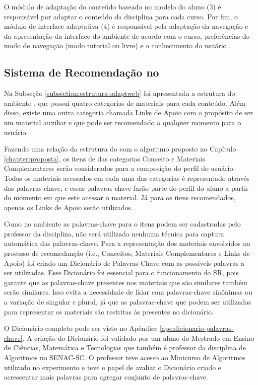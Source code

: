 O módulo de adaptação do conteúdo baseado no modelo do aluno (3) é responsável por adaptar o conteúdo da disciplina
para cada curso. Por fim, o módulo de interface adaptativa (4) é responsável pela adaptação da navegação e da
apresentação da interface do ambiente de acordo com o curso, preferências do modo de navegação (modo tutorial ou livre)
e o conhecimento do usuário \cite{gasparini2003interface}.

\subsection{Sistema de Recomendação no \adaptweb}

Na Subseção \ref{subsection:estrutura-adaptweb} foi apresentada a estrutura do ambiente \adaptweb, que possui quatro categorias
de materiais para cada conteúdo. Além disso, existe uma outra categoria chamada Links de Apoio com o propósito de ser um
material auxiliar e que pode ser recomendado a qualquer momento para o usuário.

Fazendo uma relação da estrutura do \adaptweb com o algoritmo proposto no Capítulo \ref{chapter:proposta}, os itens de
das categorias Conceito e Materiais Complementares serão considerados para a composição do perfil do usuário. Todos os
materiais acessados em cada uma das categorias é representado através das palavras-chave, e
essas palavras-chave farão parte do perfil do aluno a partir do momento em que este acessar o material. Já para os itens
recomendados, apenas os Links de Apoio serão utilizados.

Como no ambiente \adaptweb as palavras-chave para o itens podem ser cadastradas pelo professor da disciplina, não será
utilizada nenhuma técnica para captura automática das palavras-chave. Para a representação dos materiais envolvidos no
processo de recomedanção (i.e., Conceitos, Materiais Complementares e Links de Apoio) foi criado um Dicionário de Palavras-Chave
com as possíveis palavras a ser utilizadas. Esse Dicionário foi essencial para o funcionamento do SR, pois garante que as
palavras-chave presentes nos materiais que são similares também serão similares. Isso evita a necessidade de lidar com palavras-chave
sinônimas ou a variação de singular e plural, já que as palavras-chave que podem ser utilizadas para representar os materiais
são restritas às presentes no dicionário.

O Dicionário completo pode ser visto no Apêndice \ref{ape:dicionario-palavras-chave}. A criação do Dicionário foi validado
por um aluno do Mestrado em Ensino de Ciências, Matemática e Tecnologias que também é professor da disciplina de
Algoritmos no SENAC-SC. O professor teve acesso ao Minicurso de Algoritmos utilizado no experimento
e teve o papel de avaliar o Dicionário criado e acrescentar mais palavras para agregar conjunto de palavras-chave.

